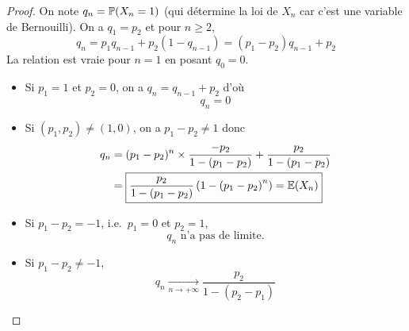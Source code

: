 \begin{proof}

    On note $q_{n}=\P(X_{n}=1)$ (qui détermine la loi de $X_{n}$ car c'est une variable de Bernouilli). On a $q_{1}=p_{2}$ et pour $n\geqslant2$,
    \begin{equation}
        q_{n}=p_{1}q_{n-1}+p_{2}(1-q_{n-1})=(p_{1}-p_{2})q_{n-1}+p_{2}
    \end{equation}
    La relation est vraie pour $n=1$ en posant $q_{0}=0$.

    \begin{itemize}
        \item Si $p_{1}=1$ et $p_{2}=0$, on a $q_{n}=q_{n-1}+p_{2}$ d'où 
        \begin{equation}
            \boxed{q_{n}=0}
        \end{equation}

        \item Si $(p_{1},p_{2})\neq(1,0)$, on a $p_{1}-p_{2}\neq1$ donc 
        \begin{align}
            q_{n}
            &=(p_{1}-p_{2})^{n}\times \frac{-p_{2}}{1-(p_{1}-p_{2})}+\frac{p_{2}}{1-(p_{1}-p_{2})}\\
            &=\boxed{\frac{p_{2}}{1-(p_{1}-p_{2})}\left(1-\left(p_{1}-p_{2}\right)^{n}\right)=\E(X_{n})}
        \end{align}

        \item Si $p_{1}-p_{2}=-1$, i.e.~$p_{1}=0$ et $p_{2}=1$, 
        \begin{equation}
            \boxed{q_{n}\text{ n'a pas de limite.}}
        \end{equation}

        \item Si $p_{1}-p_{2}\neq-1$,
        \begin{equation}
            \boxed{q_{n}\xrightarrow[n\to+\infty]{}\frac{p_{2}}{1-(p_{2}-p_{1})}}
        \end{equation}
    \end{itemize}
\end{proof}

